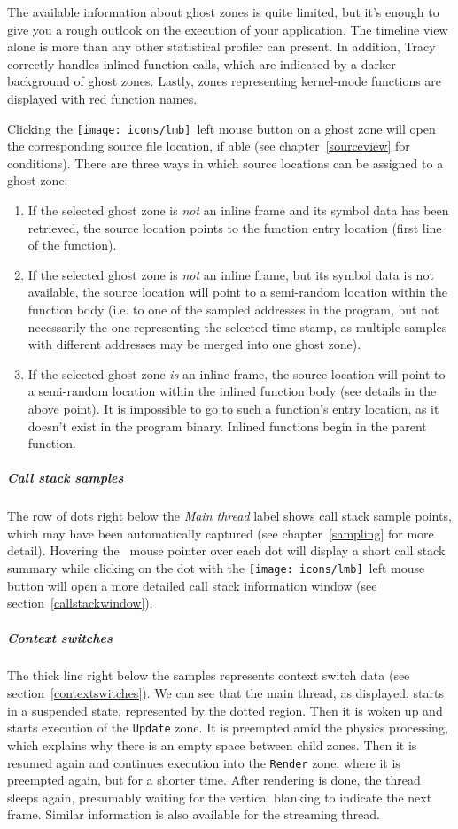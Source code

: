 \documentclass[hidelinks,titlepage,a4paper,twoside]{article}
\newcommand{\LMB}{\texttt{[image: icons/lmb]}}
\begin{document}
The available information about ghost zones is quite limited, but it's enough to give you a rough outlook on the execution of your application. The timeline view alone is more than any other statistical profiler can present. In addition, Tracy correctly handles inlined function calls, which are indicated by a darker background of ghost zones. Lastly, zones representing kernel-mode functions are displayed with red function names.

Clicking the \LMB{}~left mouse button on a ghost zone will open the corresponding source file location, if able (see chapter~\ref{sourceview} for conditions). There are three ways in which source locations can be assigned to a ghost zone:

\begin{enumerate}
\item If the selected ghost zone is \emph{not} an inline frame and its symbol data has been retrieved, the source location points to the function entry location (first line of the function).
\item If the selected ghost zone is \emph{not} an inline frame, but its symbol data is not available, the source location will point to a semi-random location within the function body (i.e. to one of the sampled addresses in the program, but not necessarily the one representing the selected time stamp, as multiple samples with different addresses may be merged into one ghost zone).
\item If the selected ghost zone \emph{is} an inline frame, the source location will point to a semi-random location within the inlined function body (see details in the above point). It is impossible to go to such a function's entry location, as it doesn't exist in the program binary. Inlined functions begin in the parent function.
\end{enumerate}

\subparagraph{Call stack samples}

The row of dots right below the \emph{Main thread} label shows call stack sample points, which may have been automatically captured (see chapter~\ref{sampling} for more detail). Hovering the \faMousePointer{}~mouse pointer over each dot will display a short call stack summary while clicking on the dot with the \LMB{}~left mouse button will open a more detailed call stack information window (see section~\ref{callstackwindow}).

\subparagraph{Context switches}

The thick line right below the samples represents context switch data (see section~\ref{contextswitches}). We can see that the main thread, as displayed, starts in a suspended state, represented by the dotted region. Then it is woken up and starts execution of the \texttt{Update} zone. It is preempted amid the physics processing, which explains why there is an empty space between child zones. Then it is resumed again and continues execution into the \texttt{Render} zone, where it is preempted again, but for a shorter time. After rendering is done, the thread sleeps again, presumably waiting for the vertical blanking to indicate the next frame. Similar information is also available for the streaming thread.
\end{document}
